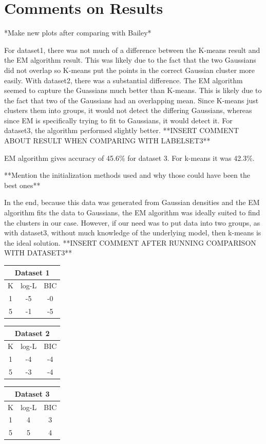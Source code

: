 \documentclass[11pt,psfig]{article}
\begin{document}
\section*{Comments on Results}

*Make new plots after comparing with Bailey*

For dataset1, there was not much of a difference between the K-means result and the EM algorithm result. This was likely due to the fact that the two Gaussians did not overlap so K-means put the points in the correct Gaussian cluster more easily. With dataset2, there was a substantial difference. The EM algorithm seemed to capture the Guassians much better than K-means. This is likely due to the fact that two of the Gaussians had an overlapping mean. Since K-means just clusters them into groups, it would not detect the differing Gaussians, whereas since EM is specifically trying to fit to Gaussians, it would detect it. For dataset3, the algorithm performed slightly better. **INSERT COMMENT ABOUT RESULT WHEN COMPARING WITH LABELSET3**

EM algorithm gives accuracy of 45.6\% for dataset 3. For k-means it was 42.3\%. 

**Mention the initialization methods used and why those could have been the best ones**

In the end, because this data was generated from Gaussian densities and the EM algorithm fits the data to Gaussians, the EM algorithm was ideally suited to find the clusters in our case. However, if our need was to put data into two groups, as with dataset3, without much knowledge of the underlying model, then k-means is the ideal solution. **INSERT COMMENT AFTER RUNNING COMPARISON WITH DATASET3**

\begin{table}[H]
  \centering
  \begin{tabular}{|c|c|c|}
    \hline
    \multicolumn{3}{|c|}{Dataset 1} \\\hline
    K & log-L & BIC \\\hline
    1 & -5 & -0 \\
    5 & -1 & -5 \\\hline
  \end{tabular}
  \begin{tabular}{|c|c|c|}
    \hline
    \multicolumn{3}{|c|}{Dataset 2} \\\hline
    K & log-L & BIC \\\hline
    1 & -4 & -4 \\
    5 & -3 & -4 \\\hline
  \end{tabular}
  \begin{tabular}{|c|c|c|}
    \hline
    \multicolumn{3}{|c|}{Dataset 3} \\\hline
    K & log-L & BIC \\\hline
    1 & 4 & 3 \\
    5 & 5 & 4 \\\hline
  \end{tabular}
\end{table}
\end{document}
